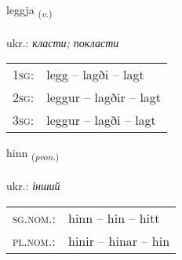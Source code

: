 \documentclass[frontgrid, backgrid]{flacards}\usepackage[]{graphicx}\usepackage[]{xcolor}
\begin{document}
{leggja \small{\textsubscript{(\textit{v.})}} \\[1ex] %
\textphonetic{[lɛca]} \\
ukr.: \emph{класти; покласти} \\  [2ex]
\renewcommand*{\arraystretch}{0.8}
\begin{tabular}{p{1cm}l}
\textsc{1sg}: & legg -- lagði -- lagt \\ 
\textsc{2sg}: & leggur -- lagðir -- lagt \\ 
\textsc{3sg}: & leggur -- lagði -- lagt \\ 
\end{tabular}
}

\renewcommand{\flhead}{\vskip5pt \fboxsep=0pt {\small\bfseries\footnotesize Fornafn | займенник}}
\renewcommand{\fcfoot}{\vskip5pt \fboxsep=0pt \hspace{2pt}{\small\bfseries\footnotesize 1K}}

\renewcommand{\blhead}{\vskip5pt {\small\bfseries\footnotesize Fornafn | займенник }}
\renewcommand{\bcfoot}{\vskip5pt \hspace{2pt}{\small\bfseries\footnotesize 1K}}


{hinn \small{\textsubscript{(\textit{pron.})}} \\[1ex] %
\textphonetic{[hɪn]} \\
ukr.: \emph{інший} \\  [2ex]
\renewcommand*{\arraystretch}{0.8}
\begin{tabular}{ll}
\textsc{sg.nom.}: & hinn  --  hin -- hitt \\ 
\textsc{pl.nom.}: & hinir -- hinar -- hin
\end{tabular}
}

\renewcommand{\flhead}{\vskip5pt \fboxsep=0pt {\small\bfseries\footnotesize Nafnorð | іменник}}
\renewcommand{\fcfoot}{\vskip5pt \fboxsep=0pt \hspace{2pt}{\small\bfseries\footnotesize 1K}}

\renewcommand{\blhead}{\vskip5pt {\small\bfseries\footnotesize Nafnorð | іменник }}
\renewcommand{\bcfoot}{\vskip5pt \hspace{2pt}{\small\bfseries\footnotesize 1K}}
\end{document}
